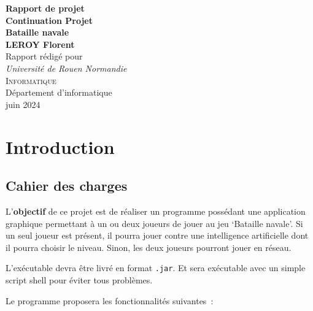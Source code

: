 \documentclass[12pt]{article}
\begin{document}
\begin{titlepage}
      \begin{center}
            {\large\bfseries Rapport de projet \\[1ex]}
            {\LARGE\bfseries Continuation Projet \\[2ex]}
            {\huge\bfseries Bataille navale\\[6.5ex]}
            {\large\bfseries LEROY Florent\\[1ex]}
            \vspace{4ex}
            Rapport rédigé pour\\[5pt]
            \textit{Université de Rouen Normandie}\\[2cm]
            \textsc{\large Informatique}\\[12ex]
            \vfill
            Département d'informatique\\
            \vfill
            juin 2024
      \end{center}
\end{titlepage}
\newpage
\tableofcontents
\newpage

\section{Introduction}
\subsection{Cahier des charges}

L'\textbf{objectif} de ce projet est de réaliser un programme possédant une
application graphique
permettant à un ou deux joueurs de jouer au jeu `Bataille navale'. Si un seul
joueur est présent, il pourra jouer contre une intelligence artificielle dont
il pourra choisir le niveau. Sinon, les deux joueurs pourront jouer en réseau.

\bigskip

L'exécutable devra être livré en format \texttt{.jar}. Et sera exécutable avec
un simple script shell pour éviter tous problèmes.

\bigskip

Le programme proposera les fonctionnalités suivantes :

\bigskip
\end{document}

